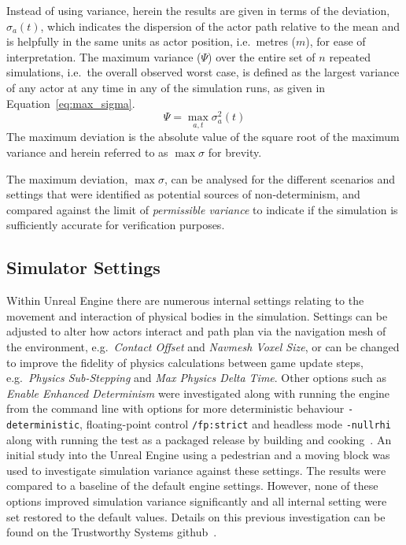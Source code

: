 Instead of using variance, herein the results are given in terms of the deviation, $\sigma_a(t)$, which indicates the dispersion of the actor path relative to the mean and is helpfully in the same units as actor position, i.e.\ metres ($m$), for ease of interpretation. The maximum variance ($\Psi$) over the entire set of $n$ repeated simulations, i.e.\ the overall observed worst case, is defined as the largest variance of any actor at any time in any of the simulation runs, as given in Equation~\ref{eq:max_sigma}. 
\begin{equation} \label{eq:max_sigma}
\Psi = \max_{a,t}\sigma_a^{2}(t)
\end{equation}
The maximum deviation is the absolute value of the square root of the maximum variance and herein referred to as ${\max\sigma}$ for brevity. 

The maximum deviation, $\max\sigma$, can be analysed for the different scenarios and settings that were identified as potential sources of non-determinism, and compared against the limit of \textit{permissible variance} to indicate if the simulation is sufficiently accurate for verification purposes.


\subsection{Simulator Settings}

Within Unreal Engine there are numerous internal settings relating to the movement and interaction of physical bodies in the simulation. Settings can be adjusted to alter how actors interact and path plan via the navigation mesh of the environment, e.g.\ \textit{Contact Offset} and \textit{Navmesh Voxel Size}, or can be changed to improve the fidelity of physics calculations between game update steps, e.g.\ \textit{Physics Sub-Stepping} and \textit{Max Physics Delta Time}. Other options such as \textit{Enable Enhanced Determinism} were investigated along with running the engine from the command line with options for more deterministic behaviour \texttt{-deterministic}, floating-point control \texttt{/fp:strict} and headless mode \texttt{-nullrhi} along with running the test as a packaged release by building and cooking~\cite{releasing_project}. An initial study into the Unreal Engine using a pedestrian and a moving block was used to investigate simulation variance against these settings. The results were compared to a baseline of the default engine settings. However, none of these options improved simulation variance significantly and all internal setting were set restored to the default values. Details on this previous investigation can be found on the Trustworthy Systems github~\cite{TSLUnrealEngineTesting}. 

